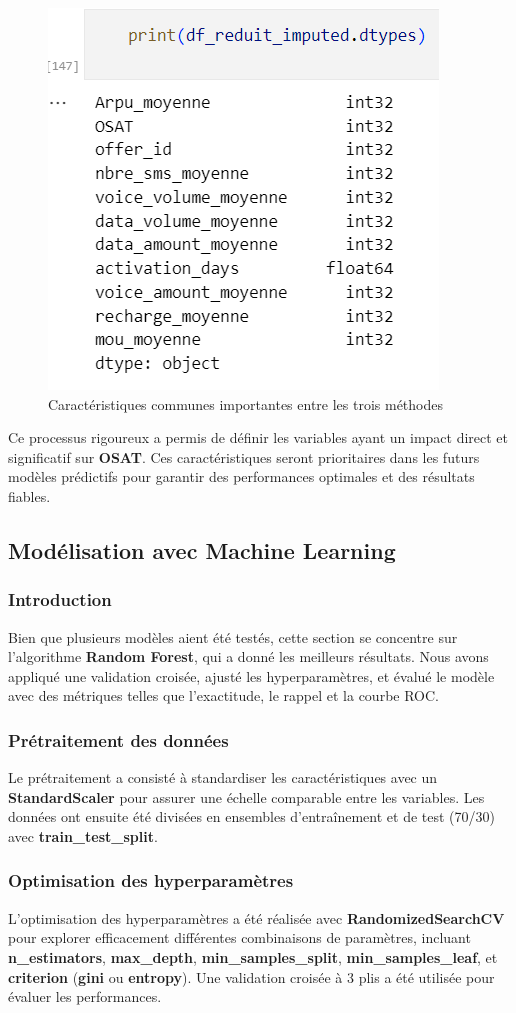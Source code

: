 \begin{figure}[H]
    \centering
    \includegraphics[width=0.4\linewidth]{capture_sas_69.png}
    \caption{Caractéristiques communes importantes entre les trois méthodes}
\end{figure}

Ce processus rigoureux a permis de définir les variables ayant un impact direct et significatif sur \textbf{OSAT}. Ces caractéristiques seront prioritaires dans les futurs modèles prédictifs pour garantir des performances optimales et des résultats fiables.

\subsection{Modélisation avec Machine Learning}

\subsubsection{Introduction}
Bien que plusieurs modèles aient été testés, cette section se concentre sur l'algorithme \textbf{Random Forest}, qui a donné les meilleurs résultats. Nous avons appliqué une validation croisée, ajusté les hyperparamètres, et évalué le modèle avec des métriques telles que l'exactitude, le rappel et la courbe ROC.

\subsubsection{Prétraitement des données}
Le prétraitement a consisté à standardiser les caractéristiques avec un \textbf{StandardScaler} pour assurer une échelle comparable entre les variables. Les données ont ensuite été divisées en ensembles d'entraînement et de test (70/30) avec \textbf{train\_test\_split}.

\subsubsection{Optimisation des hyperparamètres}
L'optimisation des hyperparamètres a été réalisée avec \textbf{RandomizedSearchCV} pour explorer efficacement différentes combinaisons de paramètres, incluant \textbf{n\_estimators}, \textbf{max\_depth}, \textbf{min\_samples\_split}, \textbf{min\_samples\_leaf}, et \textbf{criterion} (\textbf{gini} ou \textbf{entropy}). Une validation croisée à 3 plis a été utilisée pour évaluer les performances.

